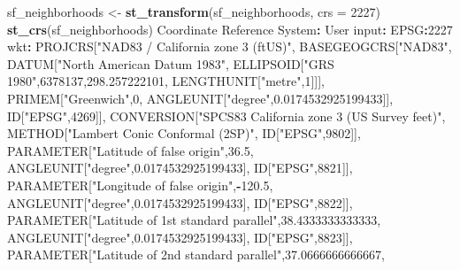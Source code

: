 \documentclass[
  12pt,
]{book}
\newenvironment{Shaded}{\begin{snugshade}}{\end{snugshade}}
\newcommand{\DataTypeTok}[1]{\textcolor[rgb]{0.27,0.27,0.27}{#1}}
\newcommand{\DecValTok}[1]{\textcolor[rgb]{0.06,0.06,0.06}{#1}}
\newcommand{\FloatTok}[1]{\textcolor[rgb]{0.06,0.06,0.06}{#1}}
\newcommand{\KeywordTok}[1]{\textcolor[rgb]{0.27,0.27,0.27}{\textbf{#1}}}
\newcommand{\NormalTok}[1]{#1}
\newcommand{\OperatorTok}[1]{\textcolor[rgb]{0.43,0.43,0.43}{\textbf{#1}}}
\newcommand{\StringTok}[1]{\textcolor[rgb]{0.5,0.5,0.5}{#1}}
\begin{document}
\begin{Shaded}
\begin{Highlighting}[]
\NormalTok{sf\_neighborhoods \textless{}{-}}\StringTok{ }\KeywordTok{st\_transform}\NormalTok{(sf\_neighborhoods, }\DataTypeTok{crs =} \DecValTok{2227}\NormalTok{)}
\KeywordTok{st\_crs}\NormalTok{(sf\_neighborhoods)}
\NormalTok{Coordinate Reference System}\OperatorTok{:}
\StringTok{  }\NormalTok{User input}\OperatorTok{:}\StringTok{ }\NormalTok{EPSG}\OperatorTok{:}\DecValTok{2227} 
\NormalTok{  wkt}\OperatorTok{:}
\NormalTok{PROJCRS[}\StringTok{"NAD83 / California zone 3 (ftUS)"}\NormalTok{,}
\NormalTok{    BASEGEOGCRS[}\StringTok{"NAD83"}\NormalTok{,}
\NormalTok{        DATUM[}\StringTok{"North American Datum 1983"}\NormalTok{,}
\NormalTok{            ELLIPSOID[}\StringTok{"GRS 1980"}\NormalTok{,}\DecValTok{6378137}\NormalTok{,}\FloatTok{298.257222101}\NormalTok{,}
\NormalTok{                LENGTHUNIT[}\StringTok{"metre"}\NormalTok{,}\DecValTok{1}\NormalTok{]]],}
\NormalTok{        PRIMEM[}\StringTok{"Greenwich"}\NormalTok{,}\DecValTok{0}\NormalTok{,}
\NormalTok{            ANGLEUNIT[}\StringTok{"degree"}\NormalTok{,}\FloatTok{0.0174532925199433}\NormalTok{]],}
\NormalTok{        ID[}\StringTok{"EPSG"}\NormalTok{,}\DecValTok{4269}\NormalTok{]],}
\NormalTok{    CONVERSION[}\StringTok{"SPCS83 California zone 3 (US Survey feet)"}\NormalTok{,}
\NormalTok{        METHOD[}\StringTok{"Lambert Conic Conformal (2SP)"}\NormalTok{,}
\NormalTok{            ID[}\StringTok{"EPSG"}\NormalTok{,}\DecValTok{9802}\NormalTok{]],}
\NormalTok{        PARAMETER[}\StringTok{"Latitude of false origin"}\NormalTok{,}\FloatTok{36.5}\NormalTok{,}
\NormalTok{            ANGLEUNIT[}\StringTok{"degree"}\NormalTok{,}\FloatTok{0.0174532925199433}\NormalTok{],}
\NormalTok{            ID[}\StringTok{"EPSG"}\NormalTok{,}\DecValTok{8821}\NormalTok{]],}
\NormalTok{        PARAMETER[}\StringTok{"Longitude of false origin"}\NormalTok{,}\OperatorTok{{-}}\FloatTok{120.5}\NormalTok{,}
\NormalTok{            ANGLEUNIT[}\StringTok{"degree"}\NormalTok{,}\FloatTok{0.0174532925199433}\NormalTok{],}
\NormalTok{            ID[}\StringTok{"EPSG"}\NormalTok{,}\DecValTok{8822}\NormalTok{]],}
\NormalTok{        PARAMETER[}\StringTok{"Latitude of 1st standard parallel"}\NormalTok{,}\FloatTok{38.4333333333333}\NormalTok{,}
\NormalTok{            ANGLEUNIT[}\StringTok{"degree"}\NormalTok{,}\FloatTok{0.0174532925199433}\NormalTok{],}
\NormalTok{            ID[}\StringTok{"EPSG"}\NormalTok{,}\DecValTok{8823}\NormalTok{]],}
\NormalTok{        PARAMETER[}\StringTok{"Latitude of 2nd standard parallel"}\NormalTok{,}\FloatTok{37.0666666666667}\NormalTok{,}

\end{Highlighting}
\end{Shaded}
\end{document}
